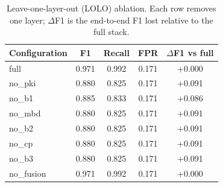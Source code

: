 \begin{table}[t]
\centering
\caption{Leave-one-layer-out (LOLO) ablation. Each row removes one layer; $\Delta$F1 is the end-to-end F1 lost relative to the full stack.}
\label{tab:lolo}
\begin{tabular}{lcccc}
\toprule
Configuration & F1 & Recall & FPR & $\Delta$F1 vs full \\
\midrule
full & 0.971 & 0.992 & 0.171 & +0.000 \\
no\_pki & 0.880 & 0.825 & 0.171 & +0.091 \\
no\_b1 & 0.885 & 0.833 & 0.171 & +0.086 \\
no\_mbd & 0.880 & 0.825 & 0.171 & +0.091 \\
no\_b2 & 0.880 & 0.825 & 0.171 & +0.091 \\
no\_cp & 0.880 & 0.825 & 0.171 & +0.091 \\
no\_b3 & 0.880 & 0.825 & 0.171 & +0.091 \\
no\_fusion & 0.971 & 0.992 & 0.171 & +0.000 \\
\bottomrule
\end{tabular}
\end{table}
